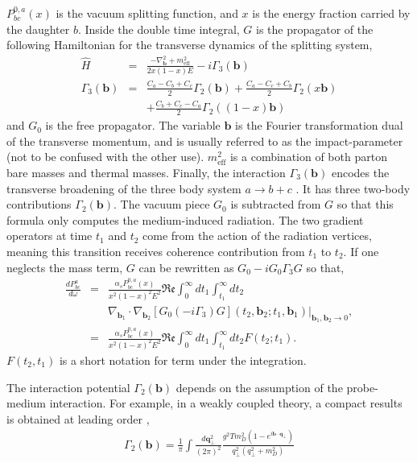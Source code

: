 $P^{0,a}_{bc}(x)$ is the vacuum splitting function, and $x$ is the energy fraction carried by the daughter $b$.
Inside the double time integral, $G$ is the propagator of the following Hamiltonian for the transverse dynamics of the splitting system,
\begin{eqnarray}
\hat{H} &=& \frac{-\nabla^2_{\mathbf{b}} + m^2_\textrm{eff}}{2x(1-x)E} - i \Gamma_3(\mathbf{b})\\
\Gamma_3(\mathbf{b}) &=& \frac{C_a-C_b+C_c}{2}\Gamma_2(\mathbf{b}) + \frac{C_a-C_c+C_b}{2}\Gamma_2(x\mathbf{b}) \\\nonumber
&&+ \frac{C_b+C_c-C_a}{2}\Gamma_2((1-x)\mathbf{b})
\end{eqnarray}
and $G_0$ is the free propagator. The variable $\mathbf{b}$ is the Fourier transformation dual of the transverse momentum, and is usually referred to as the impact-parameter (not to be confused with the other use).
$m^2_\textrm{eff}$ is a combination of both parton bare masses and thermal masses.
Finally, the interaction $\Gamma_3(\mathbf{b})$ encodes the transverse broadening of the three body system $a\rightarrow b+c$ \cite{Zakharov:1997uu}.
It has three two-body contributions $\Gamma_2(\mathbf{b})$.
The vacuum piece $G_0$ is subtracted from $G$ so that this formula only computes the medium-induced radiation.
The two gradient operators at time $t_1$ and $t_2$ come from the action of the radiation vertices, meaning this transition receives coherence contribution from $t_1$ to $t_2$.
If one neglects the mass term, $G$ can be rewritten as $G_0 -i G_0\Gamma_3 G$ so that,
\begin{eqnarray}
\nonumber
\frac{dP^{a}_{bc}}{d\omega} &=& \frac{\alpha_s P^{0,a}_{bc}(x)}{x^2(1-x)^2 E^2}\mathfrak{Re}\int_0^\infty dt_1 \int_{t_1}^{\infty} dt_2\\ &&\nabla_{\mathbf{b}_1} \cdot\nabla_{\mathbf{b}_2} [G_0(-i\Gamma_3) G](t_2, \mathbf{b}_2;t_1, \mathbf{b}_1)|_{\mathbf{b}_1, \mathbf{b}_2 \rightarrow 0},\\
&=& \frac{\alpha_s P^{0,a}_{bc}(x)}{x^2(1-x)^2 E^2}\mathfrak{Re}\int_0^\infty dt_1 \int_{t_1}^{\infty} dt_2 F(t_2; t_1).
\end{eqnarray}
$F(t_2, t_1)$ is a short notation for term under the integration.

The interaction potential $\Gamma_2(\mathbf{b})$ depends on the assumption of the probe-medium interaction.
For example, in a weakly coupled theory, a compact results is obtained at leading order \cite{Aurenche:2002pd},
\begin{eqnarray}
\Gamma_2(\mathbf{b}) = \frac{1}{\pi}\int \frac{d\mathbf{q}_\perp^2}{(2\pi)^2} \frac{g^2 T m_D^2 (1-e^{i\mathbf{b}\cdot\mathbf{q_\perp}})}{q_\perp^2(q_\perp^2+m_D^2)}
\end{eqnarray}

